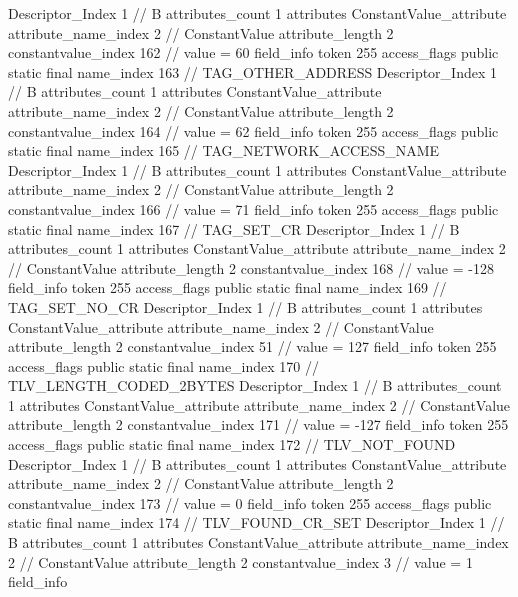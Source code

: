 {{{{{				Descriptor_Index	1		// B
				attributes_count	1
				attributes {
				ConstantValue_attribute {
					attribute_name_index	2		// ConstantValue
					attribute_length	2
					constantvalue_index	162		// value = 60
				}
				}
			}
			field_info {
				token	255
				access_flags	public static final
				name_index	163		// TAG_OTHER_ADDRESS
				Descriptor_Index	1		// B
				attributes_count	1
				attributes {
				ConstantValue_attribute {
					attribute_name_index	2		// ConstantValue
					attribute_length	2
					constantvalue_index	164		// value = 62
				}
				}
			}
			field_info {
				token	255
				access_flags	public static final
				name_index	165		// TAG_NETWORK_ACCESS_NAME
				Descriptor_Index	1		// B
				attributes_count	1
				attributes {
				ConstantValue_attribute {
					attribute_name_index	2		// ConstantValue
					attribute_length	2
					constantvalue_index	166		// value = 71
				}
				}
			}
			field_info {
				token	255
				access_flags	public static final
				name_index	167		// TAG_SET_CR
				Descriptor_Index	1		// B
				attributes_count	1
				attributes {
				ConstantValue_attribute {
					attribute_name_index	2		// ConstantValue
					attribute_length	2
					constantvalue_index	168		// value = -128
				}
				}
			}
			field_info {
				token	255
				access_flags	public static final
				name_index	169		// TAG_SET_NO_CR
				Descriptor_Index	1		// B
				attributes_count	1
				attributes {
				ConstantValue_attribute {
					attribute_name_index	2		// ConstantValue
					attribute_length	2
					constantvalue_index	51		// value = 127
				}
				}
			}
			field_info {
				token	255
				access_flags	public static final
				name_index	170		// TLV_LENGTH_CODED_2BYTES
				Descriptor_Index	1		// B
				attributes_count	1
				attributes {
				ConstantValue_attribute {
					attribute_name_index	2		// ConstantValue
					attribute_length	2
					constantvalue_index	171		// value = -127
				}
				}
			}
			field_info {
				token	255
				access_flags	public static final
				name_index	172		// TLV_NOT_FOUND
				Descriptor_Index	1		// B
				attributes_count	1
				attributes {
				ConstantValue_attribute {
					attribute_name_index	2		// ConstantValue
					attribute_length	2
					constantvalue_index	173		// value = 0
				}
				}
			}
			field_info {
				token	255
				access_flags	public static final
				name_index	174		// TLV_FOUND_CR_SET
				Descriptor_Index	1		// B
				attributes_count	1
				attributes {
				ConstantValue_attribute {
					attribute_name_index	2		// ConstantValue
					attribute_length	2
					constantvalue_index	3		// value = 1
				}
				}
			}
			field_info {
}}}}}
